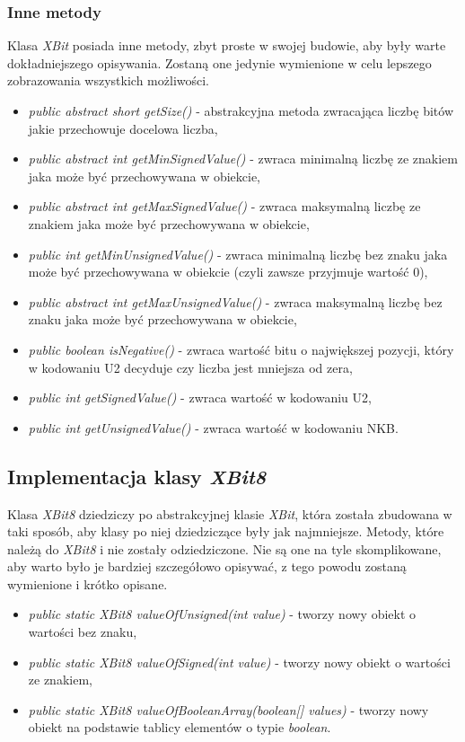 \subsubsection{Inne metody}
Klasa \emph{XBit} posiada inne metody, zbyt proste w swojej budowie, aby były warte dokładniejszego opisywania. Zostaną one jedynie wymienione w celu lepszego zobrazowania wszystkich możliwości.
\begin{itemize}  
	\item \emph{public abstract short getSize()} - abstrakcyjna metoda zwracająca liczbę bitów jakie przechowuje docelowa liczba,
	\item \emph{public abstract int getMinSignedValue()} - zwraca minimalną liczbę ze znakiem jaka może być przechowywana w obiekcie,
	\item \emph{public abstract int getMaxSignedValue()} - zwraca maksymalną liczbę ze znakiem jaka może być przechowywana w obiekcie,
	\item \emph{public int getMinUnsignedValue()} - zwraca minimalną liczbę bez znaku jaka może być przechowywana w obiekcie (czyli zawsze przyjmuje wartość 0),
	\item \emph{public abstract int getMaxUnsignedValue()} - zwraca maksymalną liczbę bez znaku jaka może być przechowywana w obiekcie,
	\item \emph{public boolean isNegative()} - zwraca wartość bitu o największej pozycji, który w kodowaniu U2 decyduje czy liczba jest mniejsza od zera,
	\item \emph{public int getSignedValue()} - zwraca wartość w kodowaniu U2,
	\item \emph{public int getUnsignedValue()} - zwraca wartość w kodowaniu NKB.
\end{itemize}

\subsection{Implementacja klasy \emph{XBit8}}
Klasa \emph{XBit8} dziedziczy po abstrakcyjnej klasie \emph{XBit}, która została zbudowana w taki sposób, aby klasy po niej dziedziczące były jak najmniejsze. Metody, które należą do \emph{XBit8} i nie zostały odziedziczone. Nie są one na tyle skomplikowane, aby warto było je bardziej szczegółowo opisywać, z tego powodu zostaną wymienione i krótko opisane.
\begin{itemize}  
	\item \emph{public static XBit8 valueOfUnsigned(int value)} - tworzy nowy obiekt o wartości bez znaku,
	\item \emph{public static XBit8 valueOfSigned(int value)} - tworzy nowy obiekt o wartości ze znakiem,
	\item \emph{public static XBit8 valueOfBooleanArray(boolean[] values)} - tworzy nowy obiekt na podstawie tablicy elementów o typie \emph{boolean}.
\end{itemize}

